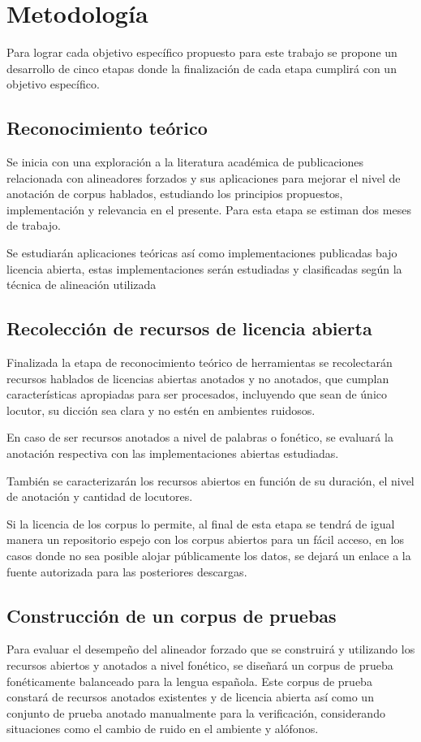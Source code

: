 \chapter{Metodología}


Para lograr cada objetivo específico propuesto para este trabajo se propone un desarrollo de cinco etapas donde la finalización de cada etapa cumplirá con un objetivo específico.

\section{Reconocimiento teórico}
 Se inicia con una exploración a la literatura académica de publicaciones relacionada con alineadores forzados y sus aplicaciones para mejorar el nivel de anotación de corpus hablados, estudiando los principios propuestos, implementación y relevancia en el presente. Para esta etapa se estiman dos meses de trabajo.
 
 Se estudiarán aplicaciones teóricas así como implementaciones publicadas bajo licencia abierta, estas implementaciones serán estudiadas y clasificadas según la técnica de alineación utilizada

\section{Recolección de recursos de licencia abierta}
Finalizada la etapa de reconocimiento teórico de herramientas se recolectarán recursos hablados de licencias abiertas anotados y no anotados, que cumplan características apropiadas para ser procesados, incluyendo que sean de único locutor, su dicción sea clara y no estén en ambientes ruidosos. 

En caso de ser recursos anotados a nivel de palabras o fonético, se evaluará la anotación respectiva con las implementaciones abiertas estudiadas.

También se caracterizarán los recursos abiertos en función de su duración, el nivel de anotación y cantidad de locutores.

Si la licencia de los corpus lo permite, al final de esta etapa se tendrá de igual manera un repositorio espejo con los corpus abiertos para un fácil acceso, en los casos donde no sea posible alojar públicamente los datos, se dejará un enlace a la fuente autorizada para las posteriores descargas.

\section{Construcción de un corpus de pruebas}
Para evaluar el desempeño del alineador forzado que se construirá y utilizando los recursos abiertos y anotados a nivel fonético, se diseñará un corpus de prueba fonéticamente balanceado para la lengua española. Este corpus de prueba constará de recursos anotados existentes y de licencia abierta así como un conjunto de prueba anotado manualmente para la verificación, considerando situaciones como el cambio de ruido en el ambiente y alófonos.

